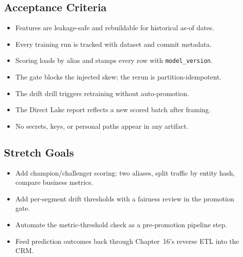 \subsection*{Acceptance Criteria}
\begin{itemize}
    \item[\(\square\)] Features are leakage-safe and rebuildable for historical as-of dates.
    \item[\(\square\)] Every training run is tracked with dataset and commit metadata.
    \item[\(\square\)] Scoring loads by alias and stamps every row with \texttt{model\_version}.
    \item[\(\square\)] The gate blocks the injected skew; the rerun is partition-idempotent.
    \item[\(\square\)] The drift drill triggers retraining without auto-promotion.
    \item[\(\square\)] The Direct Lake report reflects a new scored batch after framing.
    \item[\(\square\)] No secrets, keys, or personal paths appear in any artifact.
\end{itemize}

\subsection*{Stretch Goals}
\begin{itemize}
    \item Add champion/challenger scoring: two aliases, split traffic by entity hash, compare business metrics.
    \item Add per-segment drift thresholds with a fairness review in the promotion gate.
    \item Automate the metric-threshold check as a pre-promotion pipeline step.
    \item Feed prediction outcomes back through Chapter~16's reverse ETL into the CRM.
\end{itemize}
